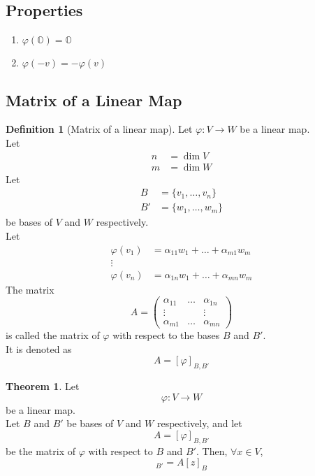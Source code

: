 \documentclass[fleqn, a4paper, 12pt, draft]{article}
\theoremstyle{definition}
\newtheorem{definition}{Definition} %
\theoremstyle{theorem}
\newtheorem{theorem}{Theorem} %
\theoremstyle{remark}
\numberwithin{corollary}{theorem}
\numberwithin{equation}{theorem}
\begin{document}
\subsection{Properties}

\begin{enumerate}
	\item $\varphi (\mathbb{O}) = \mathbb{O}$
	\item $\varphi (-v) = - \varphi (v)$
\end{enumerate}

\subsection{Matrix of a Linear Map}

\begin{definition}[Matrix of a linear map]
	Let $\varphi : V \to W$ be a linear map.\\
	Let
	\begin{align*}
		n &= \dim V\\
		m &= \dim W
	\end{align*}
	Let
	\begin{align*}
		B &= \{v_1, \dots, v_n\}\\
		B' &= \{w_1, \dots, w_m\}
	\end{align*}
	be bases of $V$ and $W$ respectively.\\
	Let 
	\begin{align*}
		\varphi (v_1) &= \alpha_{11} w_{1} + \dots + \alpha_{m1} w_{m}\\
		\vdots\\
		\varphi (v_n) &= \alpha_{1n} w_{1} + \dots + \alpha_{mn} w_{m}
	\end{align*}
	The matrix
	\begin{equation*}
		A = 
		\begin{pmatrix}
			\alpha_{11} & \dots & \alpha_{1n}\\
			\vdots & & \vdots\\
			\alpha_{m1} & \dots & \alpha_{mn}
		\end{pmatrix}
	\end{equation*}
	is called the matrix of $\varphi$ with respect to the bases $B$ and $B'$.\\
	It is denoted as
	\begin{equation*}
		A = [\varphi]_{B, B'}
	\end{equation*}
\end{definition}

\begin{theorem}
	Let 
	\begin{equation*}
		\varphi : V \to W
	\end{equation*}
	be a linear map.\\
	Let $B$ and $B'$ be bases of $V$ and $W$ respectively, and let 
	\begin{equation*}
		A = [\varphi]_{B, B'}
	\end{equation*}
	be the matrix of $\varphi$ with respect to $B$ and $B'$. Then, $\forall x \in V$,
	\begin{equation*}
		[\varphi(z)]_{B'} = A [z]_B
	\end{equation*}
\end{theorem}
\end{document}
